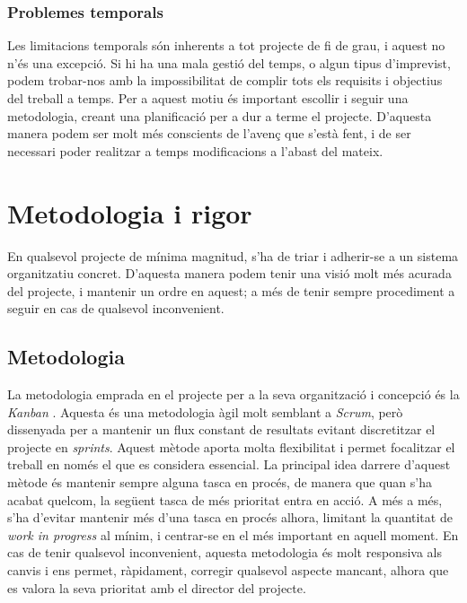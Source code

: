\documentclass[a4paper]{report}
\begin{document}
	\subsubsection{Problemes temporals}
	Les limitacions temporals són inherents a tot projecte de fi de grau, i aquest no n'és una excepció. Si hi ha una mala gestió del temps, o algun tipus d'imprevist, podem trobar-nos amb la impossibilitat de complir tots els requisits i objectius del treball a temps. \newline
	Per a aquest motiu és important escollir i seguir una metodologia, creant una planificació per a dur a terme el projecte. D'aquesta manera podem ser molt més conscients de l'avenç que s'està fent, i de ser necessari poder realitzar a temps modificacions a l'abast del mateix.
	
	\section{Metodologia i rigor}
	En qualsevol projecte de mínima magnitud, s'ha de triar i adherir-se a un sistema organitzatiu concret. D'aquesta manera podem tenir una visió molt més acurada del projecte, i mantenir un ordre en aquest; a més de tenir sempre procediment a seguir en cas de qualsevol inconvenient.
	\subsection{Metodologia}
	La metodologia emprada en el projecte per a la seva organització i concepció és la \textit{Kanban} \cite{Anderson2010}. Aquesta és una metodologia àgil molt semblant a \textit{Scrum}, però dissenyada per a mantenir un flux constant de resultats evitant discretitzar el projecte en \textit{sprints}. Aquest mètode aporta molta flexibilitat i permet focalitzar el treball en només el que es considera essencial.
	\newline
	La principal idea darrere d'aquest mètode és mantenir sempre alguna tasca en procés, de manera que quan s'ha acabat quelcom, la següent tasca de més prioritat entra en acció. A més a més, s'ha d'evitar mantenir més d'una tasca en procés alhora, limitant la quantitat de \textit{work in progress} al mínim, i centrar-se en el més important en aquell moment.
	\newline
	En cas de tenir qualsevol inconvenient, aquesta metodologia és molt responsiva als canvis i ens permet, ràpidament, corregir qualsevol aspecte mancant, alhora que es valora la seva prioritat amb el director del projecte.
	
\end{document}
